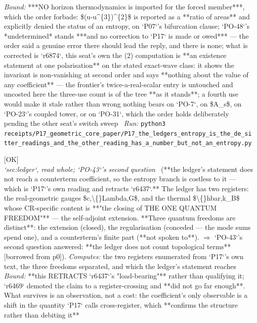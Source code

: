 \begin{description}
 \emph{Bound:}  ***NO horizon thermodynamics is imported for the forced member***, which the order forbade: \$(u-u\textasciicircum{}\{3\})\textasciicircum{}\{2\}\$ is reported as a **ratio of areas** and explicitly denied the status of an entropy, on `P07`'s bifurcation clause; `PO-48`'s *undetermined* stands  ***and no correction to `P17` is made or owed*** --- the order said a genuine error there should lead the reply, and there is none; what is corrected is `r6874`, this seat's own  the (2) computation is **an existence statement at one polarisation** on the stated exact-wave class: it shows the invariant is non-vanishing at second order and says **nothing about the value of any coefficient** --- the frontier's twice-a-real-scalar entry is untouched and uncosted here  the three-use count is of the tree **as it stands**; a fourth use would make it stale rather than wrong  nothing bears on `PO-7`, on \$A\_s\$, on `PO-23`'s coupled tower, or on `PO-31`, which the order holds deliberately pending the other seat's switch sweep
\ \emph{Run:} \texttt{python3 receipts/P17\_geometric\_core\_paper/P17\_the\_ledgers\_entropy\_is\_the\_de\_sitter\_readings\_and\_the\_other\_reading\_has\_a\_number\_but\_not\_an\_entropy.py}
\item[\rcptlabel{P17_the_ledger_does_not_count_a_counterterm_coefficient}{P17R2}\textbf{P17R2}\quad\texttt{P17\_the\_ledger\_does\_not\_count\_a\_counterterm\_coefficient}]\hfill\textsf{[OK]}\\
\textit{`sec:ledger`, read whole; `PO-43`'s second question} \ (**the ledger's statement does not reach a counterterm coefficient, so the entropy branch is costless to it --- which is `P17`'s own reading and retracts `r6437`.** The ledger has two registers: the real-geometric gauges \$c,\textbackslash\{\}Lambda,G\$, and the thermal \$\textbackslash\{\}hbar,k\_B\$ whose CR-specific content is **"the closing of THE ONE QUANTUM FREEDOM"** --- the self-adjoint extension. **Three quantum freedoms are distinct**: the extension (closed), the regularisation (conceded --- the mode sums spend one), and a counterterm's finite part (**not spoken to**). \ensuremath{\Rightarrow} `PO-43`'s second question answered: **the ledger does not count topological terms** [borrowed from p0]). 
\emph{Computes:} the two registers enumerated from `P17`'s own text, the three freedoms separated, and which the ledger's statement reaches
 \emph{Bound:}  **this RETRACTS `r6437`'s "load-bearing"** rather than qualifying it; `r6469` demoted the claim to a register-crossing and **did not go far enough**. What survives is an observation, not a cost: the coefficient's only observable is a shift in the quantity `P17` calls cross-register, which **confirms the structure rather than debiting it**

\end{description}

